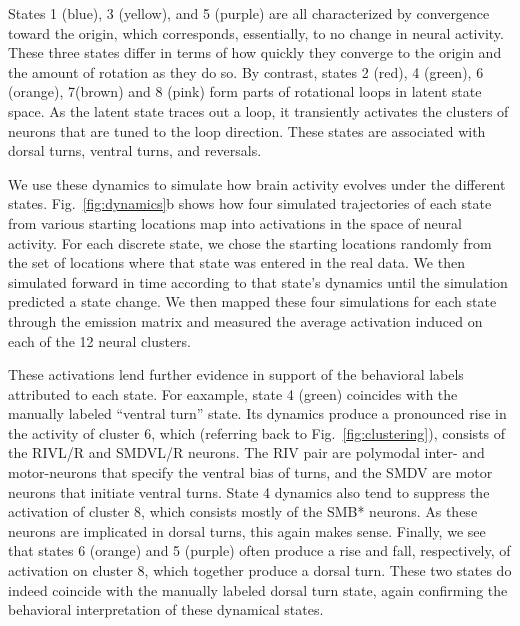 \documentclass[11pt]{article}
\begin{document}
States 1 (blue), 3 (yellow), and 5 (purple) are all characterized
by convergence toward the origin, which corresponds, essentially, to
no change in neural activity. These three states differ in terms of how
quickly they converge to the origin and the amount of rotation as
they do so.  By contrast, states 2 (red), 4 (green), 6 (orange), 7(brown)
and 8 (pink) form parts of rotational loops in latent state space.
As the latent state traces out a loop, it transiently activates
the clusters of neurons that are tuned to the loop direction.
These states are associated with dorsal turns, ventral turns, and
reversals.

We use these dynamics to simulate how brain activity evolves
under the different states. Fig.~\ref{fig:dynamics}b shows how four
simulated trajectories of each state from various starting locations map 
into activations in the space of neural activity. For each discrete state,
we chose the starting locations randomly from the set of locations where
that state was entered in the real data.  We then simulated forward in
time according to that state's dynamics until the simulation predicted
a state change.  We then mapped these four simulations for each state
through the emission matrix and measured the average activation induced
on each of the 12 neural clusters.

These activations lend further evidence in support of the behavioral
labels attributed to each state. For eaxample, state 4 (green) coincides
with the manually labeled ``ventral turn'' state.  Its dynamics produce
a pronounced rise in the activity of cluster 6, which (referring back
to Fig.~\ref{fig:clustering}), consists of the \textsf{RIVL/R} and
\textsf{SMDVL/R} neurons.  The \textsf{RIV} pair are polymodal inter-
and motor-neurons that specify the ventral bias of turns, and the
\textsf{SMDV} are motor neurons that initiate ventral turns.  State 4
dynamics also tend to suppress the activation of cluster 8, which
consists mostly of the \textsf{SMB*} neurons.  As these neurons are
implicated in dorsal turns, this again makes sense. Finally, we see
that states 6 (orange) and 5 (purple) often produce a rise and fall, respectively,
of activation on cluster 8, which together produce a dorsal turn.
These two states do indeed coincide with the manually labeled dorsal
turn state, again confirming the behavioral interpretation of these
dynamical states.
\end{document}
